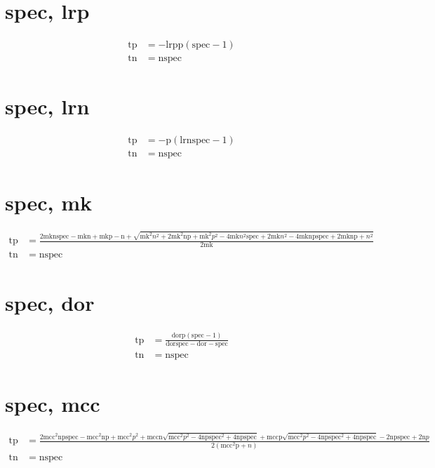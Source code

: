 \documentclass[3p,times]{elsarticle}
\begin{document}
\begin{footnotesize}
\begin{landscape}
\section{spec, lrp}
\begin{align}
\mathrm{tp} &= - \mathrm{lrp} \mathrm{p} \left(\mathrm{spec} - 1\right)\\
\mathrm{tn} &= \mathrm{n} \mathrm{spec}
\end{align}
\section{spec, lrn}
\begin{align}
\mathrm{tp} &= - \mathrm{p} \left(\mathrm{lrn} \mathrm{spec} - 1\right)\\
\mathrm{tn} &= \mathrm{n} \mathrm{spec}
\end{align}
\section{spec, mk}
\begin{align}
\mathrm{tp} &= \frac{2 \mathrm{mk} \mathrm{n} \mathrm{spec} - \mathrm{mk} \mathrm{n} + \mathrm{mk} \mathrm{p} - \mathrm{n} + \sqrt{\mathrm{mk}^{2} n^{2} + 2 \mathrm{mk}^{2} \mathrm{n} \mathrm{p} + \mathrm{mk}^{2} p^{2} - 4 \mathrm{mk} n^{2} \mathrm{spec} + 2 \mathrm{mk} n^{2} - 4 \mathrm{mk} \mathrm{n} \mathrm{p} \mathrm{spec} + 2 \mathrm{mk} \mathrm{n} \mathrm{p} + n^{2}}}{2 \mathrm{mk}}\\
\mathrm{tn} &= \mathrm{n} \mathrm{spec}
\end{align}
\section{spec, dor}
\begin{align}
\mathrm{tp} &= \frac{\mathrm{dor} \mathrm{p} \left(\mathrm{spec} - 1\right)}{\mathrm{dor} \mathrm{spec} - \mathrm{dor} - \mathrm{spec}}\\
\mathrm{tn} &= \mathrm{n} \mathrm{spec}
\end{align}
\section{spec, mcc}
\begin{align}
\mathrm{tp} &= \frac{2 \mathrm{mcc}^{2} \mathrm{n} \mathrm{p} \mathrm{spec} - \mathrm{mcc}^{2} \mathrm{n} \mathrm{p} + \mathrm{mcc}^{2} p^{2} + \mathrm{mcc} \mathrm{n} \sqrt{\mathrm{mcc}^{2} p^{2} - 4 \mathrm{n} \mathrm{p} \mathrm{spec}^{2} + 4 \mathrm{n} \mathrm{p} \mathrm{spec}} + \mathrm{mcc} \mathrm{p} \sqrt{\mathrm{mcc}^{2} p^{2} - 4 \mathrm{n} \mathrm{p} \mathrm{spec}^{2} + 4 \mathrm{n} \mathrm{p} \mathrm{spec}} - 2 \mathrm{n} \mathrm{p} \mathrm{spec} + 2 \mathrm{n} p}{2 \left(\mathrm{mcc}^{2} \mathrm{p} + n\right)}\\
\mathrm{tn} &= \mathrm{n} \mathrm{spec}
\end{align}

\end{landscape}
\end{footnotesize}
\end{document}
